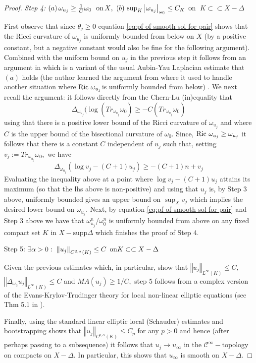 \documentclass[11pt,oneside,english]{amsart}
\numberwithin{equation}{section}
\numberwithin{figure}{section}
\theoremstyle{plain}
\theoremstyle{plain}
\theoremstyle{plain}
\theoremstyle{plain}
\theoremstyle{remark}
\theoremstyle{definition}
\begin{document}
\begin{proof}
\emph{Step 4: $(a)\,\omega_{u_{j}}\geq\frac{1}{C}\omega_{0}\,\mbox{\,\ on\,\ensuremath{X},\,\,\,}(b)\,\sup_{K}\left|\omega_{u_{j}}\right|_{\omega_{0}}\leq C_{K}$
$\mbox{on\,}$ $K\subset\subset X-\Delta$}

First observe that since $\theta_{j}\geq0$ equation \ref{eq:pf of smooth sol for pair}
shows that the Ricci curvature of $\omega_{u_{j}}$ is uniformly bounded
from below on $X$ (by a positive constant, but a negative constant
would also be fine for the following argument). Combined with the
uniform bound on $u_{j}$ in the previous step it follows from an
argument in \cite{b-k} which is a variant of the usual Aubin-Yau
Laplacian estimate \cite{au,y} that $(a)$ holds (the author learned
the argument from \cite{rub1} where it used to handle another situation
where $\mbox{Ric \ensuremath{\omega_{u_{j}}}}$is uniformly bounded
from below) . We next recall the argument: it follows directly from
the Chern-Lu (in)equality that 
\[
\Delta_{\omega_{u_{j}}}(\log(Tr_{\omega_{u_{j}}}\omega_{0})\geq-C(Tr_{\omega_{u_{j}}}\omega_{0})
\]
 using that there is a positive lower bound of the Ricci curvature
of $\omega_{u_{j}}$ and where $C$ is the upper bound of the bisectional
curvature of $\omega_{0}.$ Since, $\mbox{Ric \ensuremath{\omega_{u_{j}}\geq\omega_{u_{j}}}}$
it follows that there is a constant $C$ independent of $u_{j}$ such
that, setting $v_{j}:=Tr_{\omega_{u_{j}}}\omega_{0},$ we have
\begin{equation}
\Delta_{\omega_{u_{j}}}(\log v_{j}-(C+1)u_{j})\geq-(C+1)n+v_{j}\label{eq:second order yau ineq}
\end{equation}
 Evaluating the inequality above at a point where $\log v_{j}-(C+1)u_{j}$
attains its maximum (so that the lhs above is non-positive) and using
that $u_{j}$ is, by Step 3 above, uniformly bounded gives an upper
bound on $\sup_{X}v_{j}$ which implies the desired lower bound on
$\omega_{u_{j}}.$ Next, by equation \ref{eq:pf of smooth sol for pair}
and Step 3 above we have that $\omega_{u_{j}}^{n}/\omega_{0}^{n}$
is uniformly bounded from above on any fixed compact set $K$ in $X-\mbox{supp}\Delta$
which finishes the proof of Step 4.

Step 5: $\exists\alpha>0:\,\,\left\Vert u_{j}\right\Vert _{C^{2,\alpha}(K)}\leq C\mbox{\,\ on}K\subset\subset X-\Delta$

Given the previous estimates which, in particular, show that $\left\Vert u_{j}\right\Vert _{L^{\infty}(K)}\leq C,$
$\left\Vert \Delta_{\omega_{0}}u_{j}\right\Vert _{L^{\infty}(K)}\leq C$
and $MA(u_{j})\geq1/C,$ step 5 follows from a complex version of
the Evans-Krylov-Trudinger theory for local non-linear elliptic equations
(see Thm 5.1 in \cite{bl2}).

Finally, using the standard linear elliptic local (Schauder) estimates
and bootstrapping shows that $\left\Vert u_{j}\right\Vert _{C^{p,\alpha}(K)}\leq C_{p}$
for any $p>0$ and hence (after perhaps passing to a subsequence)
it follows that $u_{j}\rightarrow u_{\infty}$ in the $\mathcal{C}^{\infty}-$topology
on compacts on $X-\Delta.$ In particular, this shows that $u_{\infty}$
is smooth on $X-\Delta.$ 
\end{proof}
\end{document}
